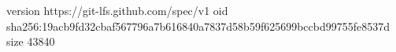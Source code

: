 version https://git-lfs.github.com/spec/v1
oid sha256:19acb9fd32cbaf567796a7b616840a7837d58b59f625699bccbd99755fe8537d
size 43840
